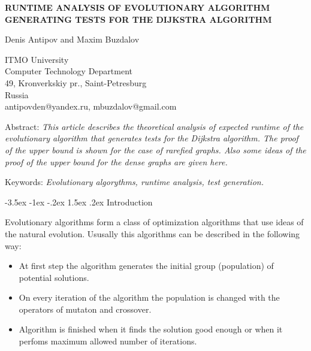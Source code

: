 \documentclass[a4paper,10pt]{article}
\makeatletter
\theoremstyle{definition}
\renewcommand\section{\@startsection {section}{1}{\z@}%
                                   {-3.5ex \@plus -1ex \@minus -.2ex}%
                                   {1.5ex \@plus.2ex}%
                                   {\large\bfseries}}
\makeatother
\begin{document}
\pagestyle{empty}

\begin{center}
{\bf \Large RUNTIME ANALYSIS OF EVOLUTIONARY ALGORITHM\\
\medskip GENERATING TESTS FOR THE DIJKSTRA ALGORITHM}
\end{center}

\smallskip
\begin{center}
{\large Denis Antipov and Maxim Buzdalov}
\end{center}

\smallskip
\begin{center}
ITMO University\\
Computer Technology Department\\
49, Kronverkskiy pr., Saint-Petresburg \\
Russia\\
antipovden@yandex.ru, mbuzdalov@gmail.com
\end{center}

\bigskip
\noindent Abstract: \textit{This article describes the theoretical analysis of expected runtime of the evolutionary algorithm that generates tests for the Dijkstra algorithm. The proof of the upper bound is shown for the case of rarefied graphs. Also some ideas of the proof of the upper bound for the dense graphs are given here.}

\vspace*{10pt} \noindent Keywords: \textit{Evolutionary algorythms, runtime analysis, test generation.}

\bigskip
\section{Introduction}
\label{sec:1}

Evolutionary algorithms form a class of optimization algorithms that use ideas of the natural evolution. Ususally this algorithms can be described in the following way:
\begin{itemize}
 \item At first step the algorithm generates the initial group (population) of potential solutions.
 \item On every iteration of the algorithm the population is changed with the operators of mutaton and crossover.
 \item Algorithm is finished when it finds the solution good enough or when it perfoms maximum allowed number of iterations.
\end{itemize}
\end{document}
